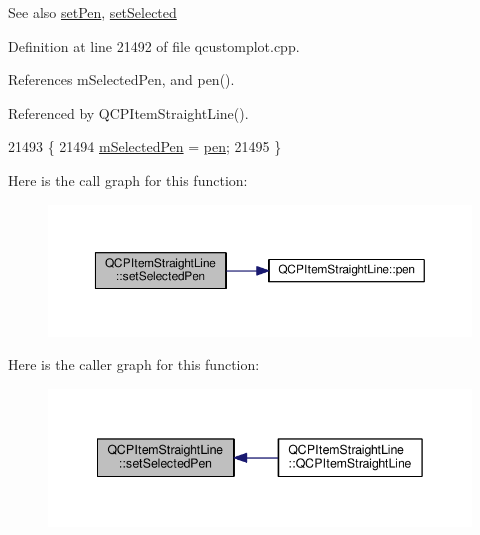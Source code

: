 \begin{DoxySeeAlso}{See also}
\hyperlink{class_q_c_p_item_straight_line_a9f36c9c9e60d7d9ac084c80380ac8601}{set\+Pen}, \hyperlink{class_q_c_p_abstract_item_a203de94ad586cc44d16c9565f49d3378}{set\+Selected} 
\end{DoxySeeAlso}


Definition at line 21492 of file qcustomplot.\+cpp.



References m\+Selected\+Pen, and pen().



Referenced by Q\+C\+P\+Item\+Straight\+Line().


\begin{DoxyCode}
21493 \{
21494   \hyperlink{class_q_c_p_item_straight_line_a0307a0d56a018656adbf798bc84c2a4b}{mSelectedPen} = \hyperlink{class_q_c_p_item_straight_line_ad858ab1a444391aab778f765453ea222}{pen};
21495 \}
\end{DoxyCode}


Here is the call graph for this function\+:\nopagebreak
\begin{figure}[H]
\begin{center}
\leavevmode
\includegraphics[width=350pt]{class_q_c_p_item_straight_line_a5c33559498d33543fa95cf0a36e851ff_cgraph}
\end{center}
\end{figure}




Here is the caller graph for this function\+:\nopagebreak
\begin{figure}[H]
\begin{center}
\leavevmode
\includegraphics[width=342pt]{class_q_c_p_item_straight_line_a5c33559498d33543fa95cf0a36e851ff_icgraph}
\end{center}
\end{figure}




